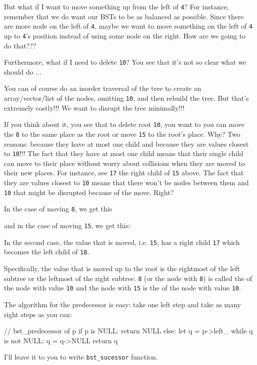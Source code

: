 But what if I want to move something up from the left of \verb!4!?
For instance, remember that we do want our BSTs to be
as balanced as possible. 
Since there are more node on the left of \verb!4!,
maybe we want to move something on the left of \verb!4! up
to \verb!4!'s position instead of using some node on the 
right. How are we going to do that???

Furthermore, what if I need to delete \verb!10!?
You see that it's not so clear what we should do ...

You can of course do an inorder traversal of the tree
to create an array/vector/list of the nodes, omitting \verb!10!,
and then rebuild the tree.
But that's extremely costly!!!
We want to disrupt the tree minimally!!!

If you think about it, you see that
to delete root \verb!10!,
you want to you can move the \verb!8! to the 
same place as the root
or move \texttt{15} to the root's place.
Why?
Two reasons:
because they have at most
one child and because they are values closest to 
\verb!10!!!!
The fact that they have at most one child
means that their single child can move to their place without
worry about collisions when they are moved to their new places.
For instance, see \texttt{17} the right child of \texttt{15} above.
The fact that they are values closest to \verb!10! means that
there won't be nodes between them and \verb!10! that might be
disrupted because of the move.
Right?

In the case of moving \verb!8!, we get this


and in the case of moving \texttt{15}, we get this:


In the second case, the value that is moved, i.e. \texttt{15},
has a right child \texttt{17} which becomes the left child of \verb!18!.

Specifically, the value that is moved up to the root
is the rightmost of the left subtree
or the leftmost of the right subtree.
\verb!8! (or the node with \verb!8!)
is called the  of the node with value \verb!10!
and the node with \texttt{15} is the 
 of the node with value \verb!10!.

The algorithm for the predecessor is easy: take one
left step and take as many right steps as you can:
\begin{console}
// bst_predecessor of p
if p is NULL:
    return NULL
else:
    let q = p->left_
    while q is not NULL:
        q = q->NULL
    return q
\end{console}
I'll leave it to you to write \verb!bst_sucessor! function.

